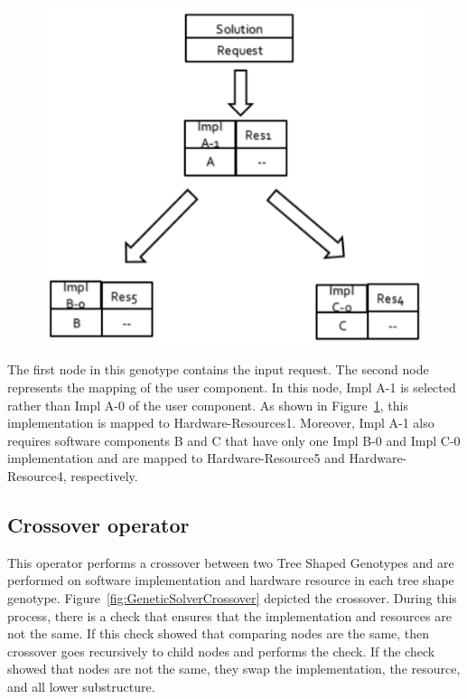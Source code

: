 \begin{figure}
	\centering
	\includegraphics[width=\textwidth]{images/TreeShapeGenotypeExample.png}
	\caption{}
	\label{fig:TreeShapeGenotypeExample}
\end{figure}

The first node in this genotype contains the input request. The second node represents the mapping of the user component. In this node, Impl A-1 is selected rather than Impl A-0 of the user component. As shown in Figure~\ref{fig:TreeShapeGenotypeExample}, this implementation is mapped to Hardware-Resources1. Moreover, Impl A-1 also requires software components B and C that have only one Impl B-0 and Impl C-0 implementation and are mapped to Hardware-Resource5 and Hardware-Resource4, respectively.

\subsection{Crossover operator}
This operator performs a crossover between two Tree Shaped Genotypes and are performed on software implementation and hardware resource in each tree shape genotype. Figure~\ref{fig:GeneticSolverCrossover} depicted the crossover. 
During this process, there is a check that ensures that the implementation and resources are not the same. If this check showed that comparing nodes are the same, then crossover goes recursively to child nodes and performs the check.
If the check showed that nodes are not the same, they swap the implementation, the resource, and all lower substructure.

